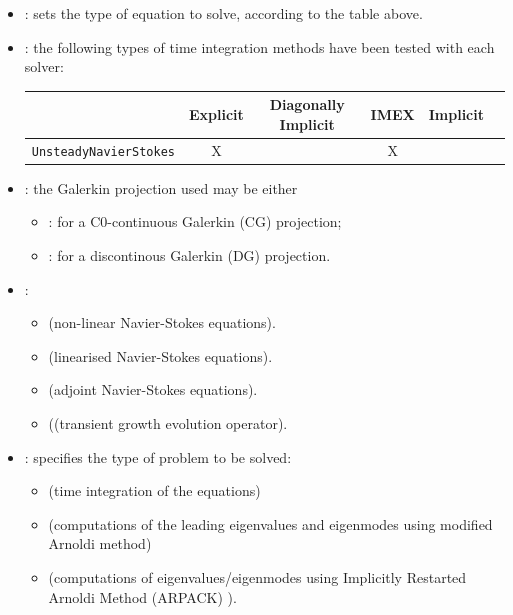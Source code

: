 \begin{itemize}
\item {}:  sets the type of equation to solve, according to the
table above.
\item {}: the following types of time integration methods have been tested with each solver:
\begin{center}
\footnotesize
\begin{tabular}{lccccc}
\toprule
{} & {Explicit} &{Diagonally Implicit} &{IMEX} & {Implicit} \\
\midrule
\texttt{UnsteadyNavierStokes} & X & &X & \\
\bottomrule
\end{tabular}
\end{center}

\item {}: the Galerkin projection used may be either
\begin{itemize}
\item {}: for a C0-continuous Galerkin (CG) projection;
\item {}: for a discontinous Galerkin (DG) projection.
\end{itemize}

\item {}:
\begin{itemize}
\item {} (non-linear Navier-Stokes equations).
\item {} (linearised Navier-Stokes equations).
\item {} (adjoint Navier-Stokes equations).
\item {} ((transient growth evolution operator).
\end{itemize}

\item {}: specifies  the type of problem to be solved:
   \begin{itemize}
    \item {} (time integration of the equations)
    \item {} (computations of the leading eigenvalues and eigenmodes using modified Arnoldi method)
    \item {} (computations of eigenvalues/eigenmodes using Implicitly Restarted Arnoldi Method (ARPACK) ).
    \end{itemize}


\end{itemize}
